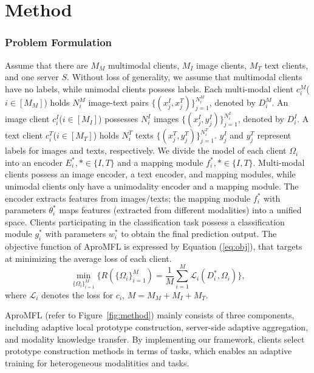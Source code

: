 \section{Method}\label{method}

\subsubsection{Problem Formulation}

Assume that there are $M_M$ multimodal clients, $M_I$ image clients, $M_T$ text clients, and one server $S$.
Without loss of generality, we assume that multimodal clients have no labels, while unimodal clients possess labels. 
Each multi-modal client $c_i^M$($i \in [M_M]$) holds $N_i^M$ image-text pairs $\{(x_j^I, x_j^T)\}_{j=1}^{N_i^M}$, denoted by $D_i^M$. 
An image client \(c_i^I\)($i\in[M_I]$) possesses \(N_i^I\) images \(\{(x_j^I, y_j^I)\}_{j=1}^{N_i^I}\), denoted by \(D_i^I\). 
A text client \(c_i^T\)($i\in[M_T]$) holds \(N_i^T\) texts \(\{(x_j^T, y_j^T)\}_{j=1}^{N_i^T}\). 
\(y_j^I\) and \(y_j^T\) represent labels for images and texts, respectively.
We divide the model of each client $\Omega_i$ into an encoder $E_{i}^*, * \in \{I,T\}$ and a mapping module $f_i^*, * \in \{I,T\}$. 
Multi-modal clients possess an image encoder, a text encoder, and mapping modules, while unimodal clients only have a unimodality encoder and a mapping module. 
The encoder extracts features from images/texts; the mapping module \(f_i^*\) with parameters \(\theta_i^*\) maps features (extracted from different modalities) into a unified space. 
Clients participating in the classification task possess a classification module \(g_i^*\) with parameters \(w_i^*\) to obtain the final prediction output.
The objective function of AproMFL is expressed by Equation (\ref{eq:obj}), that targets at minimizing the average loss of each client.
\begin{equation}\label{eq:obj}
    \min_{\{\Omega_i\}_{i=1}^M}\{R(\{\Omega_i\}_{i=1}^M)=\frac{1}{M}\sum_{i=1}^M\mathcal L_i(D_i^*,\Omega_i)\},
\end{equation}
where $\mathcal L_i$ denotes the loss for $c_i$, $M=M_M+M_I+M_T$.

AproMFL (refer to Figure~\ref{fig:method}) mainly consists of three components, including adaptive local prototype construction, server-side adaptive aggregation, and modality knowledge transfer.
By implementing our framework, clients select prototype construction methods in terms of tasks, which enables an adaptive training for heterogeneous modalitities and tasks. %

